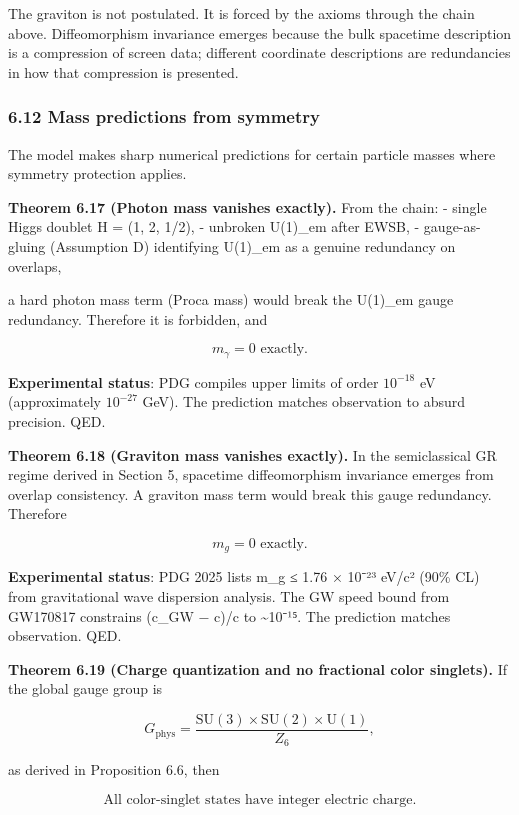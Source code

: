 \documentclass[
]{article}
\begin{document}
The graviton is not postulated. It is forced by the axioms through the
chain above. Diffeomorphism invariance emerges because the bulk
spacetime description is a compression of screen data; different
coordinate descriptions are redundancies in how that compression is
presented.

\subsubsection{6.12 Mass predictions from
symmetry}\label{mass-predictions-from-symmetry}

The model makes sharp numerical predictions for certain particle masses
where symmetry protection applies.

\textbf{Theorem 6.17 (Photon mass vanishes exactly).} From the chain: -
single Higgs doublet H = (1, 2, 1/2), - unbroken U(1)\_em after EWSB, -
gauge-as-gluing (Assumption D) identifying U(1)\_em as a genuine
redundancy on overlaps,

a hard photon mass term (Proca mass) would break the U(1)\_em gauge
redundancy. Therefore it is forbidden, and

\[
m_\gamma = 0 \text{ exactly.}
\]

\textbf{Experimental status}: PDG compiles upper limits of order
\(10^{-18}\) eV (approximately \(10^{-27}\) GeV). The prediction matches
observation to absurd precision. QED.

\textbf{Theorem 6.18 (Graviton mass vanishes exactly).} In the
semiclassical GR regime derived in Section 5, spacetime diffeomorphism
invariance emerges from overlap consistency. A graviton mass term would
break this gauge redundancy. Therefore

\[
m_g = 0 \text{ exactly.}
\]

\textbf{Experimental status}: PDG 2025 lists m\_g ≤ 1.76 × 10⁻²³ eV/c²
(90\% CL) from gravitational wave dispersion analysis. The GW speed
bound from GW170817 constrains (c\_GW − c)/c to \textasciitilde10⁻¹⁵.
The prediction matches observation. QED.

\textbf{Theorem 6.19 (Charge quantization and no fractional color
singlets).} If the global gauge group is

\[
G_{\mathrm{phys}} = \frac{\mathrm{SU}(3) \times \mathrm{SU}(2) \times \mathrm{U}(1)}{Z_6},
\]

as derived in Proposition 6.6, then

\[
\text{All color-singlet states have integer electric charge.}
\]
\end{document}
